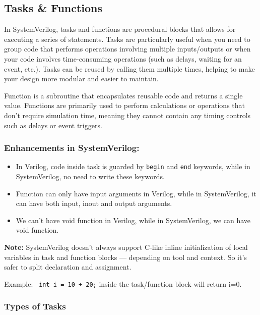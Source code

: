 \documentclass[12pt, a4paper]{article}
\begin{document}
\subsection{Tasks \& Functions}

In SystemVerilog, tasks and functions are procedural blocks that allows for executing a series of statements. Tasks are particularly useful when you need to group code that performs operations involving multiple inputs/outputs or when your code involves time-consuming operations (such as delays, waiting for an event, etc.). Tasks can be reused by calling them multiple times, helping to make your design more modular and easier to maintain.

Function is a subroutine that encapsulates reusable code and returns a single value. Functions are primarily used to perform calculations or operations that don't require simulation time, meaning they cannot contain any timing controls such as delays or event triggers.

\subsubsection{Enhancements in SystemVerilog:}

\begin{itemize}
    \item In Verilog, code inside task is guarded by \texttt{begin} and \texttt{end} keywords, while in SystemVerilog, no need to write these keywords.
    \item Function can only have input arguments in Verilog, while in SystemVerilog, it can have both input, inout and output arguments.
    \item We can't have void function in Verilog, while in SystemVerilog, we can have void function.
\end{itemize}

\textbf{Note:} SystemVerilog doesn't always support C-like inline initialization of local variables in task and function blocks — depending on tool and context. So it's safer to split declaration and assignment.

Example: \texttt{ int i = 10 + 20;} inside the task/function block will return i=0.

\subsubsection{Types of Tasks}
\end{document}
